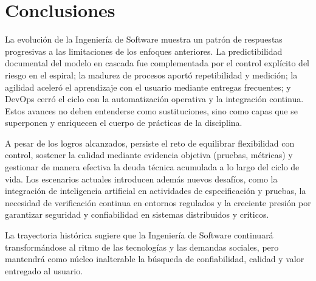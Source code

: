 \documentclass[conference]{IEEEtran}
\begin{document}
\section{Conclusiones}

La evolución de la Ingeniería de Software muestra un patrón de respuestas progresivas a las limitaciones de los enfoques anteriores. La predictibilidad documental del modelo en cascada fue complementada por el control explícito del riesgo en el espiral; la madurez de procesos aportó repetibilidad y medición; la agilidad aceleró el aprendizaje con el usuario mediante entregas frecuentes; y DevOps cerró el ciclo con la automatización operativa y la integración continua. Estos avances no deben entenderse como sustituciones, sino como capas que se superponen y enriquecen el cuerpo de prácticas de la disciplina.

A pesar de los logros alcanzados, persiste el reto de equilibrar flexibilidad con control, sostener la calidad mediante evidencia objetiva (pruebas, métricas) y gestionar de manera efectiva la deuda técnica acumulada a lo largo del ciclo de vida. Los escenarios actuales introducen además nuevos desafíos, como la integración de inteligencia artificial en actividades de especificación y pruebas, la necesidad de verificación continua en entornos regulados y la creciente presión por garantizar seguridad y confiabilidad en sistemas distribuidos y críticos.

La trayectoria histórica sugiere que la Ingeniería de Software continuará transformándose al ritmo de las tecnologías y las demandas sociales, pero mantendrá como núcleo inalterable la búsqueda de confiabilidad, calidad y valor entregado al usuario.






\end{document}
